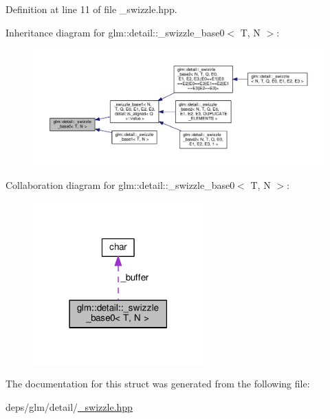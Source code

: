 Definition at line 11 of file \+\_\+swizzle.\+hpp.



Inheritance diagram for glm\+:\+:detail\+:\+:\+\_\+swizzle\+\_\+base0$<$ T, N $>$\+:
\nopagebreak
\begin{figure}[H]
\begin{center}
\leavevmode
\includegraphics[width=350pt]{db/dc0/structglm_1_1detail_1_1__swizzle__base0__inherit__graph}
\end{center}
\end{figure}


Collaboration diagram for glm\+:\+:detail\+:\+:\+\_\+swizzle\+\_\+base0$<$ T, N $>$\+:
\nopagebreak
\begin{figure}[H]
\begin{center}
\leavevmode
\includegraphics[width=186pt]{d8/dc1/structglm_1_1detail_1_1__swizzle__base0__coll__graph}
\end{center}
\end{figure}


The documentation for this struct was generated from the following file\+:\begin{DoxyCompactItemize}
\item 
deps/glm/detail/\hyperlink{__swizzle_8hpp}{\+\_\+swizzle.\+hpp}\end{DoxyCompactItemize}
